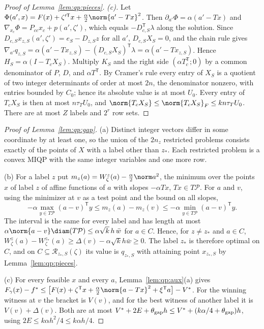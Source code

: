 \begin{proof}[Proof of Lemma~\ref{lem:qp:pieces}]
\emph{(c).} Let $\Phi(a',x)=F(x)+\zeta'^{\mathsf T} x+\frac\alpha2\norm{a'-Tx}^2$. Then
$\partial_{a'}\Phi=\alpha(a'-Tx)$ and $\nabla_{x_c}\Phi=P_{cc}x_c+p(a',\zeta')$,
which equals $-D_{c,S}^{\mathsf T}\lambda$ along the solution. Since
$D_{c,S}x_{z,S}(a',\zeta')=e_S-D_{z,S}z$ for all $a'$, $D_{c,S}X_S=0$, and the
chain rule gives
$\nabla_{a'}q_{z,S}=\alpha(a'-Tx_{z,S})-(D_{c,S}X_S)^{\mathsf T}\lambda=\alpha(a'-Tx_{z,S})$.
Hence $H_S=\alpha(I-T_cX_S)$. Multiply $K_S$ and the right side
$(\alpha T_c^{\mathsf T};0)$ by a common denominator of $P$, $D$, and $\alpha T^{\mathsf T}$.
By Cramer's rule every entry of $X_S$ is a quotient of two integer
determinants of order at most $2n$, the denominator nonzero, with entries
bounded by $C_0$; hence its absolute value is at most $U_0$. Every entry of
$T_cX_S$ is then at most $n\tau_TU_0$, and
$\norm{T_cX_S}\le\norm{T_cX_S}_F\le kn\tau_TU_0$. There are at most $Z$
labels and $2^r$ row sets.
\end{proof}

\begin{proof}[Proof of Lemma~\ref{lem:qp:gap}]
(a) Distinct integer vectors differ in some coordinate by at least one, so the
union of the $2n_z$ restricted problems consists exactly of the points of $X$
with a label other than $z_*$. Each restricted problem is a convex MIQP with
the same integer variables and one more row.

(b) For a label $z$ put $m_z(a)=W^z_\zeta(a)-\frac\alpha2\norm a^2$, the
minimum over the points $x$ of label $z$ of affine functions of $a$ with
slopes $-\alpha Tx$, $Tx\in T\mathcal P$. For $a$ and $v$, using the minimizer
at $v$ as a test point and the bound on all slopes,
\[
 -\alpha\max_{y\in T\mathcal P}(a-v)^{\mathsf T} y\le m_z(a)-m_z(v)\le-\alpha\min_{y\in T\mathcal P}(a-v)^{\mathsf T} y .
\]
The interval is the same for every label and has length at most
$\alpha\norm{a-v}\diam(T\mathcal P)\le\alpha\sqrt k\,h\,\bar w$ for $a\in C$.
Hence, for $z\ne z_*$ and $a\in C$,
$W^z_\zeta(a)-W^{z_*}_\zeta(a)\ge\Delta(v)-\alpha\sqrt kh\bar w\ge0$. The label
$z_*$ is therefore optimal on $C$, and on $C\subseteq\mathcal R_{z_*,S}(\zeta)$
its value is $q_{z_*,S}$ with attaining point $x_{z_*,S}$ by
Lemma~\ref{lem:qp:pieces}.

(c) For every feasible $x$ and every $a$, Lemma~\ref{lem:qp:aux}(a) gives
$F_\gamma(x)-f^*\le\bigl[F(x)+\zeta^{\mathsf T} x+\frac\alpha2\norm{a-Tx}^2+\xi^{\mathsf T} a\bigr]-V^*$.
For the winning witness at $v$ the bracket is $V(v)$, and for the best
witness of another label it is $V(v)+\Delta(v)$. Both are at most
$V^*+2E+\theta_{\rm gap}h\le V^*+(k\alpha/4+\theta_{\rm gap})h$, using
$2E\le k\alpha h^2/4\le k\alpha h/4$.
\end{proof}

